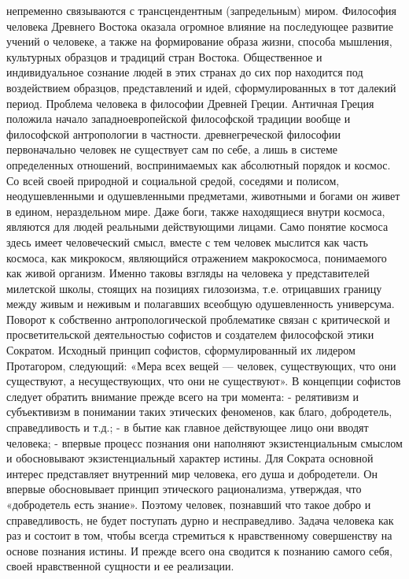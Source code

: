 \documentclass[12pt]{article}
\begin{document}
непременно связываются с трансцендентным (запредельным) миром.
Философия человека Древнего Востока оказала огромное влияние на последующее развитие учений о человеке,
а также на формирование образа жизни, способа мышления, культурных образцов и традиций стран Востока.
Общественное и  индивидуальное сознание  людей в этих странах до  сих  пор находится под  воздействием
образцов, представлений и идей, сформулированных в тот далекий период.
Проблема человека в философии Древней Греции.
Античная  Греция  положила  начало  западноевропейской  философской  традиции  вообще  и  философской
антропологии в частности. древнегреческой философии первоначально человек не существует сам по себе, а
лишь в системе определенных отношений, воспринимаемых как абсолютный порядок и космос. Со всей своей
природной  и  социальной  средой,  соседями  и  полисом,  неодушевленными  и  одушевленными  предметами,
животными и богами он живет в едином, нераздельном мире. Даже боги, также находящиеся внутри космоса,
являются  для  людей  реальными  действующими  лицами.  Само  понятие  космоса  здесь  имеет  человеческий
смысл,  вместе  с  тем  человек  мыслится  как  часть  космоса,  как  микрокосм,  являющийся  отражением
макрокосмоса,  понимаемого  как  живой  организм.  Именно  таковы  взгляды  на  человека  у  представителей
милетской школы, стоящих на позициях гилозоизма, т.е. отрицавших границу между живым и неживым и
полагавших всеобщую одушевленность универсума.
Поворот  к  собственно  антропологической  проблематике  связан  с  критической  и  просветительской
деятельностью софистов и создателем философской этики Сократом.
Исходный принцип софистов, сформулированный их лидером Протагором, следующий: «Мера всех вещей —
человек, существующих, что они существуют, а несуществующих, что они не существуют».
В концепции софистов следует обратить внимание прежде всего на три момента:
- релятивизм и субъективизм в понимании таких этических феноменов, как благо, добродетель, справедливость  
и т.д.;
- в бытие как главное действующее лицо они вводят человека;
- впервые процесс познания они наполняют экзистенциальным смыслом и обосновывают экзистенциальный
характер истины.
Для Сократа основной интерес представляет внутренний мир человека, его душа и добродетели. Он впервые
обосновывает принцип этического рационализма, утверждая, что «добродетель есть знание». Поэтому человек,
познавший что такое добро и справедливость, не будет поступать дурно и несправедливо. Задача человека как
раз и состоит в том, чтобы всегда стремиться к нравственному совершенству на основе познания истины. И
прежде всего она сводится к познанию самого себя, своей нравственной сущности и ее реализации.
\end{document}
